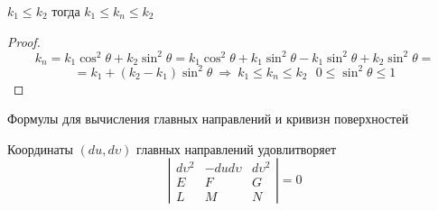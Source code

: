 \begin{block}[Следствие]
  $k_1 \le k_2$ тогда $k_1 \le k_n \le k_2$
\end{block}

\begin{proof}
  $$
  k_n = k_1 \cos^2 \theta + k_2 \sin^2 \theta = k_1 \cos^2 \theta +
  k_1 \sin^2 \theta - k_1 \sin^2 \theta + k_2 \sin^2 \theta =
  $$
  $$
  = k_1 + (k_2 - k_1)\sin^2 \theta ~ \Rightarrow ~ k_1 \le k_n \le k_2 ~~~
  0 \le \sin^2 \theta \le 1
  $$
\end{proof}

\begin{title}[\Large]
  Формулы для вычисления главных направлений и кривизн поверхностей
\end{title}

\begin{theorem}
  Координаты $(du, d\upsilon)$ главных направлений удовлитворяет
  $$
  \left|
  \begin{array}{ccc}
    d\upsilon^2 & -dud\upsilon & d\upsilon^2 \\
    E & F & G \\
    L & M & N
  \end{array}
  \right| = 0
  $$
\end{theorem}

